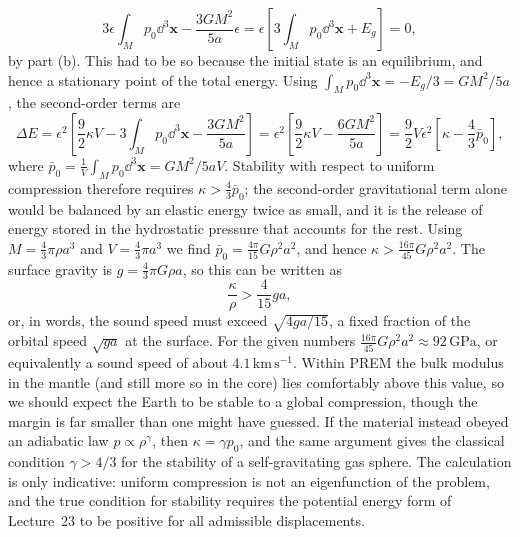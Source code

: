 \documentclass[a4paper,10pt]{paper}
\begin{document}
\begin{enumerate}
\begin{enumerate}
\begin{equation*}
    3\epsilon\int_{M}p_{0}\dd^{3}\mathbf{x}-\frac{3GM^{2}}{5a}\epsilon=\epsilon\left[3\int_{M}p_{0}\dd^{3}\mathbf{x}+E_{g}\right]=0,
\end{equation*}
by part (b). This had to be so because the initial state is an equilibrium, and hence a stationary point of the total energy. Using
$\int_{M}p_{0}\dd^{3}\mathbf{x}=-E_{g}/3=GM^{2}/5a$, the second-order terms are
\begin{equation*}
    \Delta E=\epsilon^{2}\left[\frac{9}{2}\kappa V-3\int_{M}p_{0}\dd^{3}\mathbf{x}-\frac{3GM^{2}}{5a}\right]
    =\epsilon^{2}\left[\frac{9}{2}\kappa V-\frac{6GM^{2}}{5a}\right]=\frac{9}{2}V\epsilon^{2}\left[\kappa-\frac{4}{3}\bar{p}_{0}\right],
\end{equation*}
where $\bar{p}_{0}=\frac{1}{V}\int_{M}p_{0}\dd^{3}\mathbf{x}=GM^{2}/5aV$. Stability with respect to uniform compression therefore
requires $\kappa>\tfrac{4}{3}\bar{p}_{0}$; the second-order gravitational term
alone would be balanced by an elastic energy twice as small, and it is the release of energy stored in the hydrostatic pressure
that accounts for the rest. Using $M=\tfrac{4}{3}\pi\rho a^{3}$ and $V=\tfrac{4}{3}\pi a^{3}$ we find $\bar{p}_{0}=\tfrac{4\pi}{15}G\rho^{2}a^{2}$,
and hence $\kappa>\tfrac{16\pi}{45}G\rho^{2}a^{2}$. The surface gravity is $g=\tfrac{4}{3}\pi G\rho a$, so this can be written as
\begin{equation*}
    \frac{\kappa}{\rho}>\frac{4}{15}ga,
\end{equation*}
or, in words, the sound speed must exceed $\sqrt{4ga/15}$, a fixed fraction of the orbital speed $\sqrt{ga}$ at the surface.
For the given numbers $\tfrac{16\pi}{45}G\rho^{2}a^{2}\approx 92\,\mathrm{GPa}$, or equivalently a sound speed of about $4.1\,\mathrm{km\,s^{-1}}$.
Within PREM the bulk modulus in the mantle (and still more so in the core) lies comfortably above this value, so we should
expect the Earth to be stable to a global compression, though the margin is far smaller than one might have guessed. If the
material instead obeyed an adiabatic law $p\propto\rho^{\gamma}$, then $\kappa=\gamma p_{0}$, and the same
argument gives the classical condition $\gamma>4/3$ for the stability of a self-gravitating gas sphere. The
calculation is only indicative: uniform compression is not an eigenfunction of the problem, and the true condition for stability
requires the potential energy form of Lecture~23 to be positive for all admissible displacements.
\end{enumerate}


\end{enumerate}
\end{document}
